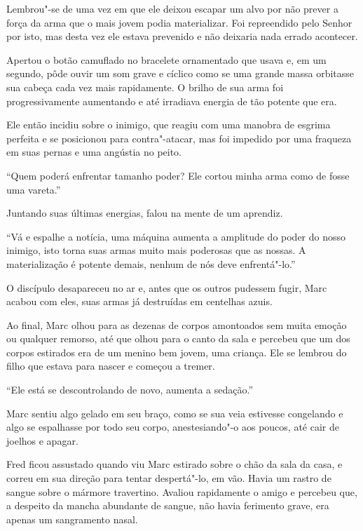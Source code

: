 Lembrou"-se de uma vez em que ele deixou escapar um alvo por não prever a força
da arma que o mais jovem podia materializar. Foi repreendido pelo Senhor
 por isto, mas desta vez ele estava prevenido e não deixaria nada
errado acontecer.

Apertou o botão camuflado no bracelete ornamentado que usava e, em um
segundo, pôde ouvir um som grave e cíclico como se uma grande massa
orbitasse sua cabeça cada vez mais rapidamente. O brilho de sua arma foi
progressivamente aumentando e até irradiava energia de tão potente que
era.

Ele então incidiu sobre o inimigo, que reagiu com uma manobra de esgrima
perfeita e se posicionou para contra"-atacar, mas foi impedido por uma
fraqueza em suas pernas e uma angústia no peito.

``Quem poderá enfrentar tamanho poder? Ele cortou minha arma como de
fosse uma vareta.''

Juntando suas últimas energias, falou na mente de um aprendiz.

``Vá e espalhe a notícia, uma máquina aumenta a amplitude do poder do
nosso inimigo, isto torna suas armas muito mais poderosas que as nossas.
A materialização é potente demais, nenhum de nós deve enfrentá"-lo.''

O discípulo desapareceu no ar e, antes que os outros pudessem fugir,
Marc acabou com eles, suas armas já destruídas em centelhas azuis.

Ao final, Marc olhou para as dezenas de corpos amontoados sem muita
emoção ou qualquer remorso, até que olhou para o canto da sala e
percebeu que um dos corpos estirados era de um menino bem jovem, uma
criança. Ele se lembrou do filho que estava para nascer e começou a
tremer.

``Ele está se descontrolando de novo, aumenta a sedação.''

Marc sentiu algo gelado em seu braço, como se sua veia estivesse
congelando e algo se espalhasse por todo seu corpo, anestesiando"-o aos
poucos, até cair de joelhos e apagar.

\asterisc


Fred ficou assustado quando viu Marc estirado sobre o chão da sala da
casa, e correu em sua direção para tentar despertá"-lo, em vão. Havia um rastro
de sangue sobre o mármore travertino. Avaliou rapidamente o amigo e
percebeu que, a despeito da mancha abundante de sangue, não havia
ferimento grave, era apenas um sangramento nasal.

